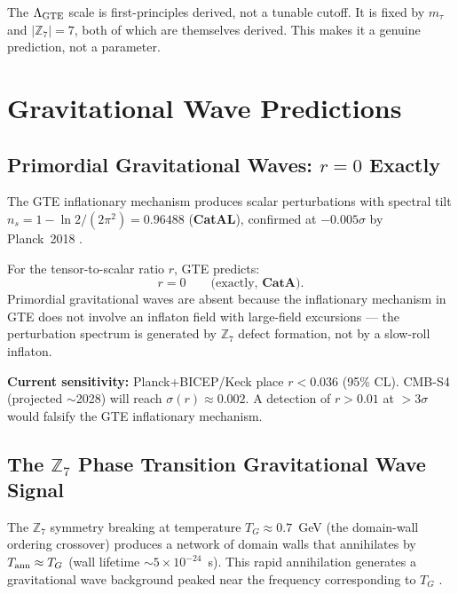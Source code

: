 \documentclass[11pt,a4paper]{article}
\newcommand{\CatAL}{\textbf{CatAL}}
\newcommand{\CatA}{\textbf{CatA}}
\begin{document}
The $\Lambda_{\rm GTE}$ scale is first-principles derived, not a tunable cutoff.
It is fixed by $m_\tau$ and $|\mathbb{Z}_7| = 7$, both of which are themselves
derived.  This makes it a genuine prediction, not a parameter.

\section{Gravitational Wave Predictions}
\label{sec:gw}

\subsection[Primordial Gravitational Waves: r = 0 Exactly]{Primordial Gravitational Waves: $r = 0$ Exactly}

The GTE inflationary mechanism produces scalar perturbations with spectral tilt
$n_s = 1 - \ln 2/(2\pi^2) = 0.96488$ (\CatAL), confirmed at $-0.005\sigma$
by Planck~2018 \cite{SpivackGTECosmology}.

For the tensor-to-scalar ratio $r$, GTE predicts:
\begin{equation}
  r = 0 \qquad \text{(exactly, } \CatA\text{).}
\end{equation}
Primordial gravitational waves are absent because the inflationary mechanism in
GTE does not involve an inflaton field with large-field excursions — the perturbation
spectrum is generated by $\mathbb{Z}_7$ defect formation, not by a slow-roll
inflaton.

\textbf{Current sensitivity:} Planck+BICEP/Keck place $r < 0.036$ (95\% CL).
CMB-S4 (projected $\sim$2028) will reach $\sigma(r) \approx 0.002$.  A detection
of $r > 0.01$ at $>3\sigma$ would falsify the GTE inflationary mechanism.

\subsection[The Z7 Phase Transition Gravitational Wave Signal]{The $\mathbb{Z}_7$ Phase Transition Gravitational Wave Signal}

The $\mathbb{Z}_7$ symmetry breaking at temperature $T_G \approx 0.7$~GeV
(the domain-wall ordering crossover) produces a network of domain walls that
annihilates by $T_{\rm ann} \approx T_G$ (wall lifetime $\sim 5 \times 10^{-24}$~s).
This rapid annihilation generates a gravitational wave background peaked near
the frequency corresponding to $T_G$ \cite{SpivackGTECompleteFramework}.
\end{document}
